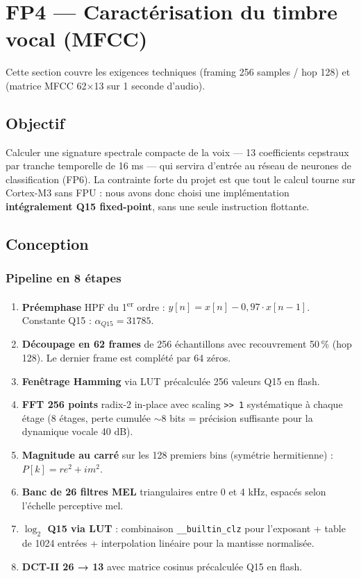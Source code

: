 \section{FP4 --- Caractérisation du timbre vocal (MFCC)}
\label{sec:fp4}

Cette section couvre les exigences techniques  (framing 256 samples / hop 128) et  (matrice MFCC 62×13 sur 1 seconde d'audio).

\subsection{Objectif}

Calculer une signature spectrale compacte de la voix --- 13 coefficients cepstraux par tranche temporelle de 16 ms --- qui servira d'entrée au réseau de neurones de classification (FP6). La contrainte forte du projet est que tout le calcul tourne sur Cortex-M3 sans FPU : nous avons donc choisi une implémentation \textbf{intégralement Q15 fixed-point}, sans une seule instruction flottante.

\subsection{Conception}

\subsubsection{Pipeline en 8 étapes}

\begin{enumerate}
    \item \textbf{Préemphase} HPF du 1\textsuperscript{er} ordre : $y[n] = x[n] - 0{,}97 \cdot x[n-1]$. Constante Q15 : $\alpha_{Q15} = 31785$.
    \item \textbf{Découpage en 62 frames} de 256 échantillons avec recouvrement 50\,\% (hop 128). Le dernier frame est complété par 64 zéros.
    \item \textbf{Fenêtrage Hamming} via LUT précalculée 256 valeurs Q15 en flash.
    \item \textbf{FFT 256 points} radix-2 in-place avec scaling \texttt{>>~1} systématique à chaque étage (8 étages, perte cumulée $\sim$8 bits = précision suffisante pour la dynamique vocale 40 dB).
    \item \textbf{Magnitude au carré} sur les 128 premiers bins (symétrie hermitienne) : $P[k] = re^2 + im^2$.
    \item \textbf{Banc de 26 filtres MEL} triangulaires entre 0 et 4 kHz, espacés selon l'échelle perceptive mel.
    \item \textbf{$\log_2$ Q15 via LUT} : combinaison \verb|__builtin_clz| pour l'exposant + table de 1024 entrées + interpolation linéaire pour la mantisse normalisée.
    \item \textbf{DCT-II 26 → 13} avec matrice cosinus précalculée Q15 en flash.
\end{enumerate}

